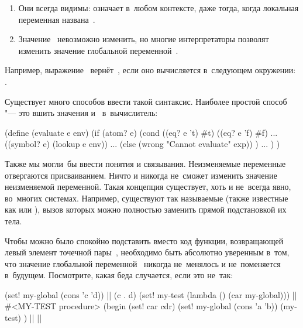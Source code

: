 \begin{enumerate}
  \item Они всегда видимы:  означает  в~любом
        контексте, даже тогда, когда локальная переменная
        названа~.
  
  \item Значение~ невозможно изменить, но многие интерпретаторы
        позволят изменить значение глобальной переменной~.
\end{enumerate}

Например, выражение~ вернёт~, если оно вычисляется
в~следующем окружении: .

Существует много способов ввести такой синтаксис. Наиболее простой способ "---
это вшить значения  и~ в~вычислитель:

\begin{code:lisp}
(define (evaluate e env)
  (if (atom? e)
      (cond ((eq? e 't) #t)
            ((eq? e 'f) #f)
            ...
            ((symbol? e) (lookup e env))
            ...
            (else (wrong "Cannot evaluate" exp)) )
      ... ) )
\end{code:lisp}

Также мы могли~бы ввести понятия  и 
связывания. Неизменяемые переменные отвергаются присваиванием. Ничто и никогда
не~сможет изменить значение неизменяемой переменной. Такая концепция существует,
хоть и не~всегда явно, во~многих системах. Например, существуют так называемые
 (также известные как  или
), вызов которых можно полностью заменить прямой подстановкой
их тела. 

Чтобы можно было спокойно подставить вместо  код функции,
возвращающей левый элемент точечной пары~, необходимо быть абсолютно
уверенным в~том, что значение глобальной переменной~ никогда не~менялось
и не~поменяется в~будущем. Посмотрите, какая беда случается, если это не~так:

\begin{code:lisp}
(set! my-global (cons 'c 'd))
   |\is| (c . d)
(set! my-test (lambda () (car my-global)))
   |\is| #<MY-TEST procedure>
(begin (set! car cdr)
       (set! my-global (cons 'a 'b))
       (my-test) )
   |\is| ||
\end{code:lisp}

